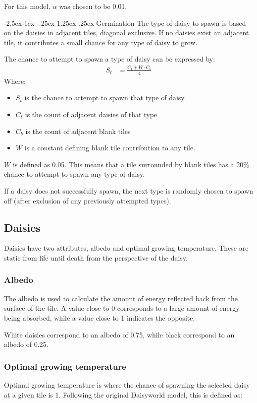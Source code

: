 \documentclass[12pt]{article}
\makeatletter
\renewcommand\paragraph{\@startsection{paragraph}{4}{\z@}%
            {-2.5ex\@plus -1ex \@minus -.25ex}%
            {1.25ex \@plus .25ex}%
            {\normalfont\normalsize\bfseries}}
\makeatother
\begin{document}
For this model, $\alpha$ was chosen to be 0.01.

\paragraph{Germination}
The type of daisy to spawn is based on the daisies in adjacent tiles,
diagonal exclusive. If no daisies exist an adjacent tile, it
contributes a small chance for any type of daisy to grow.

The chance to attempt to spawn a type of daisy can be expressed by:
\begin{align}
  S_t &= \frac{C_t+W\cdot C_b}{4}
\end{align}
Where:
\begin{itemize}
\item $S_t$ is the chance to attempt to spawn that type of daisy
\item $C_t$ is the count of adjacent daisies of that type
\item $C_b$ is the count of adjacent blank tiles
\item $W$ is a constant defining blank tile contribution to any tile.
\end{itemize}

$W$ is defined as 0.05. This means that a tile surrounded by blank
tiles has a 20\% chance to attempt to spawn any type of daisy.

If a daisy does not successfully spawn, the next type is randomly
chosen to spawn off (after exclusion of any previously attempted types).

\subsection{Daisies}
Daisies have two attributes, albedo and optimal growing
temperature. These are static from life until death from the
perspective of the daisy.


\subsubsection{Albedo}
The albedo is used to calculate the amount of energy reflected back
from the surface of the tile. A value close to 0 corresponds to a large
amount of energy being absorbed, while a value close to 1 indicates
the opposite.

White daisies correspond to an albedo of 0.75, while
black correspond to an albedo of 0.25.


\subsubsection{Optimal growing temperature}
Optimal growing temperature is where the chance of spawning the
selected daisy at a given tile is 1. Following the original Daisyworld
model, this is defined as:
\end{document}
